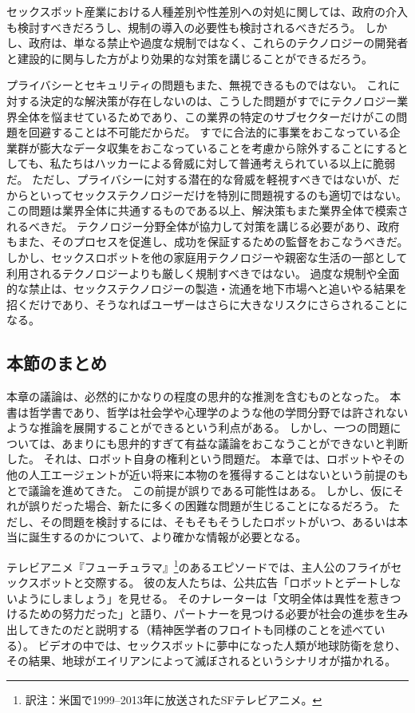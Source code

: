 \documentclass[paper=a4,book,openany]{jlreq} \usepackage{mystyle}
\begin{document}
セックスボット産業における人種差別や性差別への対処に関しては、政府の介入も検討すべきだろうし、規制の導入の必要性も検討されるべきだろう。
しかし、政府は、単なる禁止や過度な規制ではなく、これらのテクノロジーの開発者と建設的に関与した方がより効果的な対策を講じることができるだろう。

プライバシーとセキュリティの問題もまた、無視できるものではない。
これに対する決定的な解決策が存在しないのは、こうした問題がすでにテクノロジー業界全体を悩ませているためであり、この業界の特定のサブセクターだけがこの問題を回避することは不可能だからだ。
すでに合法的に事業をおこなっている企業群が膨大なデータ収集をおこなっていることを考慮から除外することにするとしても、私たちはハッカーによる脅威に対して普通考えられている以上に脆弱だ。
ただし、プライバシーに対する潜在的な脅威を軽視すべきではないが、だからといってセックステクノロジーだけを特別に問題視するのも適切ではない。
この問題は業界全体に共通するものである以上、解決策もまた業界全体で模索されるべきだ。
テクノロジー分野全体が協力して対策を講じる必要があり、政府もまた、そのプロセスを促進し、成功を保証するための監督をおこなうべきだ。
しかし、セックスロボットを他の家庭用テクノロジーや親密な生活の一部として利用されるテクノロジーよりも厳しく規制すべきではない。
過度な規制や全面的な禁止は、セックステクノロジーの製造・流通を地下市場へと追いやる結果を招くだけであり、そうなればユーザーはさらに大きなリスクにさらされることになる。

\subsection{本節のまとめ}

本章の議論は、必然的にかなりの程度の思弁的な推測を含むものとなった。
本書は哲学書であり、哲学は社会学や心理学のような他の学問分野では許されないような推論を展開することができるという利点がある。
しかし、一つの問題については、あまりにも思弁的すぎて有益な議論をおこなうことができないと判断した。
それは、ロボット自身の権利という問題だ。
本章では、ロボットやその他の人工エージェントが近い将来に本物のを獲得することはないという前提のもとで議論を進めてきた。
この前提が誤りである可能性はある。
しかし、仮にそれが誤りだった場合、新たに多くの困難な問題が生じることになるだろう。
ただし、その問題を検討するには、そもそもそうしたロボットがいつ、あるいは本当に誕生するのかについて、より確かな情報が必要となる。

テレビアニメ『フューチュラマ』\footnote{訳注：米国で1999--2013年に放送されたSFテレビアニメ。}のあるエピソードでは、主人公のフライがセックスボットと交際する。
彼の友人たちは、公共広告「ロボットとデートしないようにしましょう」を見せる。
そのナレーターは「文明全体は異性を惹きつけるための努力だった」と語り、パートナーを見つける必要が社会の進歩を生み出してきたのだと説明する（精神医学者のフロイトも同様のことを述べている）。
ビデオの中では、セックスボットに夢中になった人類が地球防衛を怠り、その結果、地球がエイリアンによって滅ぼされるというシナリオが描かれる。
\end{document}
